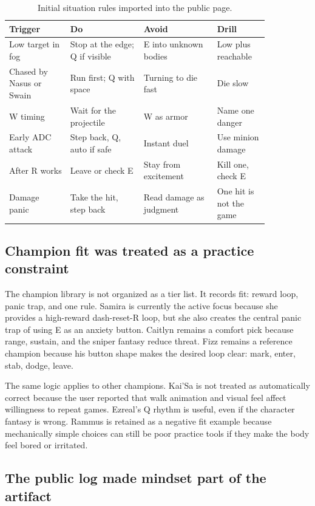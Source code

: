 \documentclass[12pt,letterpaper]{article}
\begin{document}
\begin{table}[H]
\centering
\caption{Initial situation rules imported into the public page.}
{\small
\setlength{\tabcolsep}{5pt}
\begin{tabular}{p{0.20\linewidth}p{0.24\linewidth}p{0.24\linewidth}p{0.17\linewidth}}
\toprule
Trigger & Do & Avoid & Drill \\
\midrule
Low target in fog & Stop at the edge; Q if visible & E into unknown bodies & Low plus reachable \\
Chased by Nasus or Swain & Run first; Q with space & Turning to die fast & Die slow \\
W timing & Wait for the projectile & W as armor & Name one danger \\
Early ADC attack & Step back, Q, auto if safe & Instant duel & Use minion damage \\
After R works & Leave or check E & Stay from excitement & Kill one, check E \\
Damage panic & Take the hit, step back & Read damage as judgment & One hit is not the game \\
\bottomrule
\end{tabular}
}
\end{table}

\subsection{Champion fit was treated as a practice constraint}

The champion library is not organized as a tier list. It records fit: reward loop, panic trap, and one rule. Samira is currently the active focus because she provides a high-reward dash-reset-R loop, but she also creates the central panic trap of using E as an anxiety button. Caitlyn remains a comfort pick because range, sustain, and the sniper fantasy reduce threat. Fizz remains a reference champion because his button shape makes the desired loop clear: mark, enter, stab, dodge, leave.

The same logic applies to other champions. Kai'Sa is not treated as automatically correct because the user reported that walk animation and visual feel affect willingness to repeat games. Ezreal's Q rhythm is useful, even if the character fantasy is wrong. Rammus is retained as a negative fit example because mechanically simple choices can still be poor practice tools if they make the body feel bored or irritated.

\subsection{The public log made mindset part of the artifact}
\end{document}
